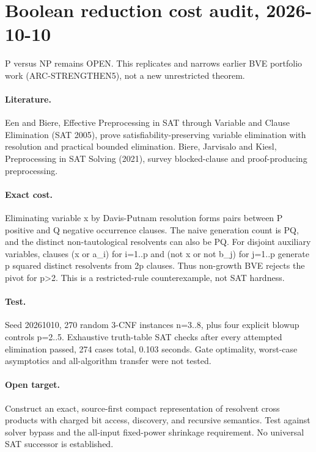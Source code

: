 \documentclass{article}
\begin{document}
\section*{Boolean reduction cost audit, 2026-10-10}
P versus NP remains OPEN. This replicates and narrows earlier BVE portfolio work (ARC-STRENGTHEN5), not a new unrestricted theorem.
\paragraph{Literature.} Een and Biere, Effective Preprocessing in SAT through Variable and Clause Elimination (SAT 2005), prove satisfiability-preserving variable elimination with resolution and practical bounded elimination. Biere, Jarvisalo and Kiesl, Preprocessing in SAT Solving (2021), survey blocked-clause and proof-producing preprocessing.
\paragraph{Exact cost.} Eliminating variable x by Davis-Putnam resolution forms pairs between P positive and Q negative occurrence clauses. The naive generation count is PQ, and the distinct non-tautological resolvents can also be PQ. For disjoint auxiliary variables, clauses (x or a_i) for i=1..p and (not x or not b_j) for j=1..p generate p squared distinct resolvents from 2p clauses. Thus non-growth BVE rejects the pivot for p>2. This is a restricted-rule counterexample, not SAT hardness.
\paragraph{Test.} Seed 20261010, 270 random 3-CNF instances n=3..8, plus four explicit blowup controls p=2..5. Exhaustive truth-table SAT checks after every attempted elimination passed, 274 cases total, 0.103 seconds. Gate optimality, worst-case asymptotics and all-algorithm transfer were not tested.
\paragraph{Open target.} Construct an exact, source-first compact representation of resolvent cross products with charged bit access, discovery, and recursive semantics. Test against solver bypass and the all-input fixed-power shrinkage requirement. No universal SAT successor is established.
\end{document}
